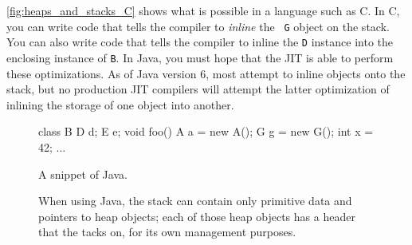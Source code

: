 \autoref{fig:heaps_and_stacks_C} shows what is possible in a language such as
C. In C, you can write code that tells the compiler to \emph{inline} the {\tt
G} object on the stack. You can also write code that tells the compiler to
inline the {\tt D} instance into the enclosing instance of {\tt B}. In Java, you
must hope that the JIT is able to perform these optimizations. As of Java
version 6, most \jres attempt to inline objects onto the stack, but no
production JIT compilers will attempt the latter optimization of inlining the
storage of one object into another.

  
\begin{figure}
\begin{subfloat}
\begin{minipage}[b]{0.4\textwidth}
\begin{shortlisting}
class B {
  D d;
  E e;
}
void foo() {
  A a = new A();
  G g = new G();
  int x = 42;
  ...
}
\end{shortlisting}
\end{minipage}
\caption{A snippet of Java.}
\end{subfloat}
	 \caption{When using Java,
	the stack can
	contain only primitive data and pointers to heap objects; each of those heap
	objects has a header that the \jre tacks on, for its own management
	purposes.}
\end{figure}

